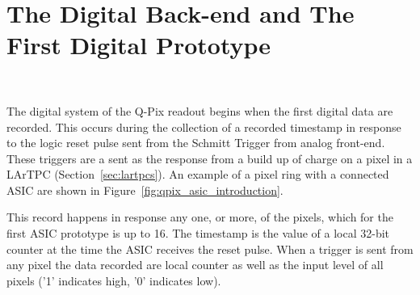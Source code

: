 \section{The Digital Back-end and The First Digital Prototype}~\label{sec:digital_prototype}

The digital system of the Q-Pix readout begins when the first digital data are recorded.
This occurs during the collection of a recorded timestamp in response to the logic reset pulse sent from the Schmitt Trigger from analog front-end.
These triggers are a sent as the response from a build up of charge on a pixel in a LArTPC (Section~\ref{sec:lartpcs}).
An example of a pixel ring with a connected ASIC are shown in Figure~\ref{fig:qpix_asic_introduction}.

This record happens in response any one, or more, of the pixels, which for the first ASIC prototype is up to 16.
The timestamp is the value of a local 32-bit counter at the time the ASIC receives the reset pulse.
When a trigger is sent from any pixel the data recorded are local counter as well as the input level of all pixels ('1' indicates high, '0' indicates low).

